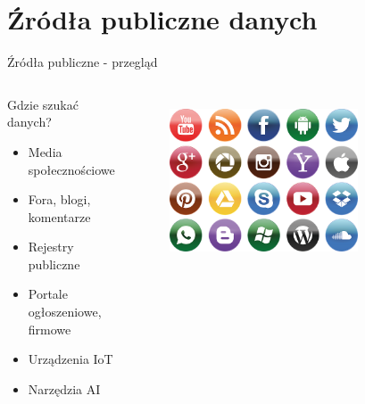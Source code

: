 \section{Źródła publiczne danych}

\begin{frame}{Źródła publiczne - przegląd}
\begin{columns}[c]
    \begin{alertblock}{Gdzie szukać danych?}
        \begin{itemize}
          \item Media społecznościowe \cite{zrodlo} \cite{zrodloArtykul}
          \item Fora, blogi, komentarze
          \item Rejestry publiczne \cite{zrodloDzialalnosc}
          \item Portale ogłoszeniowe, firmowe
          \item Urządzenia IoT \cite{zrodlo2}
          \item Narzędzia AI \cite{ai}
        \end{itemize}
        \end{alertblock}
    \centering
    \begin{figure}
        \centering
        \includegraphics[width=0.75\textwidth]{images/socialMedia.png}
        \label{fig:socialMedia}
    \end{figure}    
\end{columns}
\end{frame}

